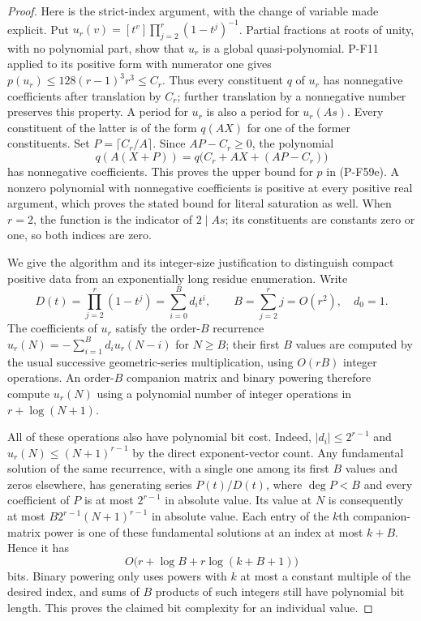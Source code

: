 \begin{proof}
Here is the strict-index argument, with the change of variable
made explicit. Put
$u_r(v)=[t^v]\prod_{j=2}^{r}(1-t^j)^{-1}$.
Partial fractions at roots of unity, with no polynomial part,
show that $u_r$ is a global quasi-polynomial. P-F11 applied to
its positive form with numerator one gives
$p(u_r)\le128(r-1)^3r^3\le C_r$.
Thus every constituent $q$ of $u_r$ has nonnegative coefficients
after translation by $C_r$; further translation by a nonnegative
number preserves this property. A period for $u_r$ is also a
period for $u_r(As)$. Every constituent of the latter is of the
form $q(AX)$ for one of the former constituents. Set
$P=\lceil C_r/A\rceil$. Since $AP-C_r\ge0$, the polynomial
\[
             q(A(X+P))=q\bigl(C_r+AX+(AP-C_r)\bigr)
\]
has nonnegative coefficients. This proves the upper bound for
$p$ in (P-F59e). A nonzero polynomial with nonnegative
coefficients is positive at every positive real argument,
which proves the stated bound for literal saturation as well.
When $r=2$, the function is the indicator of $2\mid As$;
its constituents are constants zero or one, so both indices
are zero.

We give the algorithm and its integer-size justification to
distinguish compact positive data from an exponentially long
residue enumeration. Write
\[
 D(t)=\prod_{j=2}^{r}(1-t^j)=\sum_{i=0}^{B}d_it^i,
      \qquad B=\sum_{j=2}^{r}j=O(r^2),\quad d_0=1.
                                                               \tag{P-F59i}
\]
The coefficients of $u_r$ satisfy the order-$B$ recurrence
$u_r(N)=-\sum_{i=1}^{B}d_iu_r(N-i)$ for $N\ge B$;
their first $B$ values are computed by the usual successive
geometric-series multiplication, using $O(rB)$ integer
operations. An order-$B$ companion matrix and binary powering
therefore compute $u_r(N)$ using a polynomial number of integer
operations in $r+\log(N+1)$.

All of these operations also have polynomial bit cost. Indeed,
$|d_i|\le2^{r-1}$ and $u_r(N)\le(N+1)^{r-1}$ by the direct
exponent-vector count. Any fundamental solution of the same
recurrence, with a single one among its first $B$ values and
zeros elsewhere, has generating series $P(t)/D(t)$, where
$\deg P<B$ and every coefficient of $P$ is at most
$2^{r-1}$ in absolute value. Its value at $N$ is consequently
at most $B2^{r-1}(N+1)^{r-1}$ in absolute value. Each entry of
the $k$th companion-matrix power is one of these fundamental
solutions at an index at most $k+B$. Hence it has
\[
             O\bigl(r+\log B+r\log(k+B+1)\bigr)
                                                               \tag{P-F59j}
\]
bits. Binary powering only uses powers with $k$ at most a
constant multiple of the desired index, and sums of $B$
products of such integers still have polynomial bit length.
This proves the claimed bit complexity for an individual value.


\end{proof}
